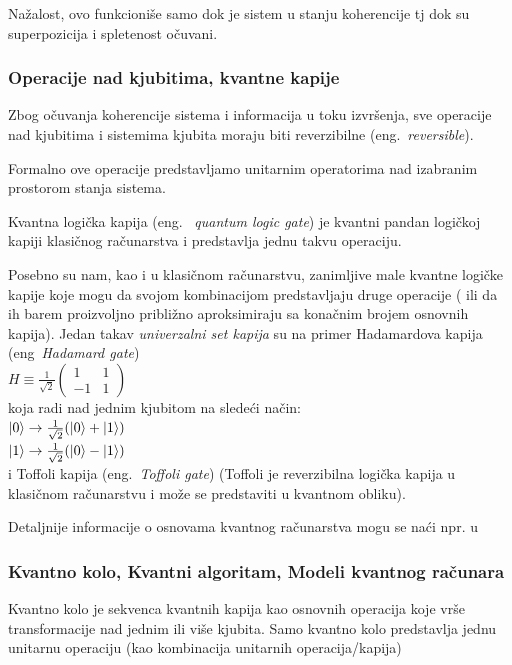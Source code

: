 \documentclass[a4paper]{article}
\begin{document}
{Nažalost, ovo funkcioniše samo dok je sistem u stanju koherencije  tj dok su superpozicija i spletenost očuvani.

\subsubsection {Operacije nad kjubitima, kvantne kapije}

Zbog očuvanja koherencije sistema i informacija u toku izvršenja, sve operacije nad kjubitima i sistemima kjubita moraju biti reverzibilne (eng.~\emph{reversible}).

Formalno ove operacije predstavljamo unitarnim operatorima nad izabranim prostorom stanja sistema.

Kvantna logička kapija (eng. ~\emph{quantum logic gate}) je kvantni pandan logičkoj kapiji klasičnog računarstva i predstavlja jednu takvu operaciju.

Posebno su nam, kao i u klasičnom računarstvu, zanimljive male kvantne logičke kapije koje mogu da svojom kombinacijom predstavljaju druge operacije ( ili da ih barem proizvoljno približno aproksimiraju sa konačnim brojem osnovnih kapija). Jedan takav \emph{univerzalni set kapija} su na primer Hadamardova kapija (eng~\emph{Hadamard gate})\\
\smallskip
$H\equiv\frac{1}{\sqrt{2}}\begin{pmatrix}
1&1\\
-1&1
\end{pmatrix}$\\
\smallskip
koja radi nad jednim kjubitom na sledeći način:\\
\smallskip
$\ket{0} \rightarrow \frac{1}{\sqrt{2}}(\ket{0} + \ket{1})$\\
\smallskip
$\ket{1} \rightarrow \frac{1}{\sqrt{2}}(\ket{0} - \ket{1})$\\

i Toffoli kapija (eng.~\emph{Toffoli gate}) (Toffoli je reverzibilna logička kapija u klasičnom računarstvu i može se predstaviti u kvantnom obliku).

Detaljnije informacije o osnovama kvantnog računarstva mogu se naći npr. u \cite{knjiga}

\subsubsection{Kvantno kolo, Kvantni algoritam, Modeli kvantnog računara}
\label{modeli}

Kvantno kolo je sekvenca kvantnih kapija kao osnovnih operacija koje vrše transformacije nad jednim ili više kjubita. Samo kvantno kolo predstavlja jednu unitarnu operaciju (kao kombinacija unitarnih operacija/kapija)

}
\end{document}
